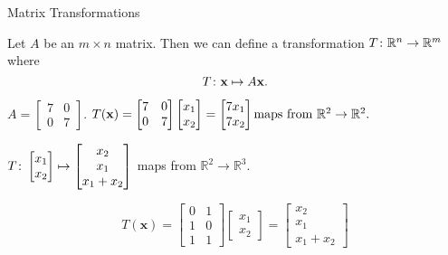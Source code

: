 \documentclass[xcolor=dvipsnames,aspectratio=169,t]{beamer}
\begin{document}
\begin{frame}{Matrix Transformations}

  Let $A$ be an $m\times n$ matrix.  Then we can define a transformation $T\colon\mathbb{R}^n\to\mathbb{R}^m$ where \[ T\colon \mathbf{x} \mapsto A\mathbf{x}. \]
  \medskip
  
  \pause
  \bb
    \item $A=\begin{bmatrix} 7 & 0\\0&7 \end{bmatrix}$.
      \quad $T( \mathbf{x}) = \begin{bmatrix} 7 & 0\\0&7 \end{bmatrix} \begin{bmatrix} x_1 \\ x_2 \end{bmatrix} = \begin{bmatrix} 7x_1\\  7x_2 \end{bmatrix} \text{maps from $\mathbb{R}^2 \to \mathbb{R}^2$.}$

  \vspace*{2em}
  
  \pause
  \item $\displaystyle T\colon \begin{bmatrix} x_1 \\ x_2 \end{bmatrix} \mapsto \begin{bmatrix} x_2 \\ x_1 \\ x_1 + x_2 \end{bmatrix}$ maps from $\mathbb{R}^2 \to \mathbb{R}^3$. \

  \[ T( \mathbf{x}) = \begin{bmatrix} 0 & 1\\1&0\\1&1 \end{bmatrix} \begin{bmatrix} x_1 \\ x_2 \end{bmatrix}
  = \begin{bmatrix} x_2 \\ x_1 \\ x_1 + x_2 \end{bmatrix}\]

  \ee
\end{frame}
\end{document}
